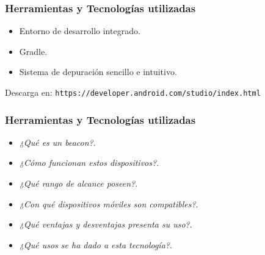 \begin{frame}
	\frametitle{Herramientas y Tecnologías utilizadas}
		\begin{itemize}
			\item Entorno de desarrollo integrado.
			\item Gradle.
			\item Sistema de depuración sencillo e intuitivo.
		\end{itemize}
		Descarga en: \texttt{https://developer.android.com/studio/index.html}
	\endblock{}
\end{frame}

\begin{frame}
	\frametitle{Herramientas y Tecnologías utilizadas}
		\begin{itemize}
			\item {\it ¿Qué es un beacon?}.
			\item {\it ¿Cómo funcionan estos dispositivos?}.
			\item {\it ¿Qué rango de alcance poseen?}.
			\item {\it ¿Con qué dispositivos móviles son compatibles?}.
			\item {\it ¿Qué ventajas y desventajas presenta su uso?}.
			\item {\it ¿Qué usos se ha dado a esta tecnología?}.
		\end{itemize}
	\endblock{}
\end{frame}


